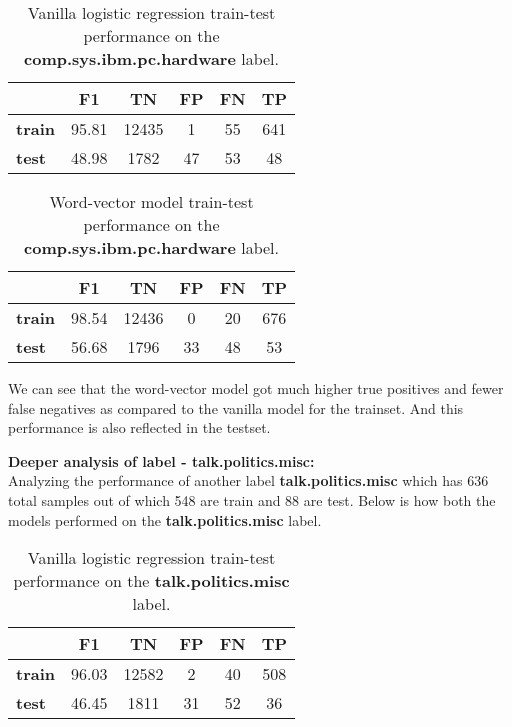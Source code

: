 \begin{table}[htbp]
\centering
\begin{tabular}{l|c|c|c|c|c|}
 & \textbf{F1} & \textbf{TN} & \textbf{FP} & \textbf{FN} & \textbf{TP} \\ \hline
\textbf{train} & 95.81 & 12435 & 1 & 55 & 641 \\
\textbf{test} & 48.98 & 1782 & 47 & 53 & 48
\end{tabular}
\caption{\label{tab:widgets}Vanilla logistic regression train-test performance on the \textbf{comp.sys.ibm.pc.hardware} label.}
\end{table}

\begin{table}[htbp]
\centering
\begin{tabular}{l|c|c|c|c|c|}
 & \textbf{F1} & \textbf{TN} & \textbf{FP} & \textbf{FN} & \textbf{TP} \\ \hline
\textbf{train} & 98.54 & 12436 & 0 & 20 & 676 \\
\textbf{test} & 56.68 & 1796 & 33 & 48 & 53
\end{tabular}
\caption{\label{tab:widgets}Word-vector model train-test performance on the \textbf{comp.sys.ibm.pc.hardware} label.}
\end{table}

We can see that the word-vector model got much higher true positives and fewer false negatives as compared to the vanilla model for the trainset. And this performance is also reflected in the testset.


\newpage
\noindent \textbf{Deeper analysis of label - talk.politics.misc:}\\

Analyzing the performance of another label \textbf{talk.politics.misc} which has 636 total samples out of which 548 are train and 88 are test. Below is how both the models performed on the \textbf{talk.politics.misc} label.

\begin{table}[htbp]
\centering
\begin{tabular}{l|c|c|c|c|c|}
 & \textbf{F1} & \textbf{TN} & \textbf{FP} & \textbf{FN} & \textbf{TP} \\ \hline
\textbf{train} & 96.03 & 12582 & 2 & 40 & 508 \\
\textbf{test} & 46.45 & 1811 & 31 & 52 & 36
\end{tabular}
\caption{\label{tab:widgets}Vanilla logistic regression train-test performance on the \textbf{talk.politics.misc} label.}
\end{table}


